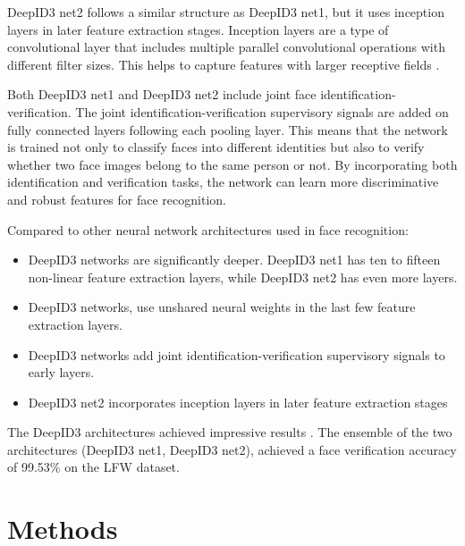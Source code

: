 \documentclass[12pt,a4paper,twocolumn]{article}
\begin{document}
DeepID3 net2 follows a similar structure as DeepID3 net1, but it uses inception layers in later feature extraction stages. Inception layers are a type of convolutional layer that includes multiple parallel convolutional operations with different filter sizes. This helps to capture features with larger receptive fields .

\par Both DeepID3 net1 and DeepID3 net2 include joint face identification-verification.
The joint identification-verification supervisory signals are added on fully connected layers following each pooling layer. This means that the network is trained not only to classify faces into different identities but also to verify whether two face images belong to the same person or not. By incorporating both identification and verification tasks, the network can learn more discriminative and robust features for face recognition.

Compared to other neural network architectures used in face recognition:
\begin{itemize}
    \item DeepID3 networks are significantly deeper. DeepID3 net1 has ten to fifteen non-linear feature extraction layers, while DeepID3 net2 has even more layers. 
    \item DeepID3 networks, use unshared neural weights in the last few feature extraction layers. 
    \item DeepID3 networks add joint identification-verification supervisory signals to early layers.
    \item DeepID3 net2 incorporates inception layers in later feature extraction stages
\end{itemize}

The DeepID3 architectures achieved impressive results . The ensemble of the two architectures (DeepID3 net1, DeepID3 net2), achieved a face verification accuracy of 99.53\% on the LFW dataset.


\section{Methods}
\end{document}
